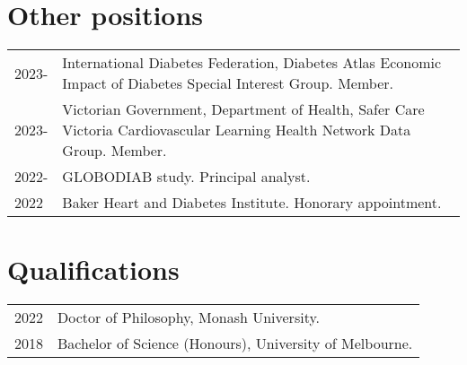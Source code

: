 \documentclass[11pt]{article}
\begin{document}
\section*{Other positions}
\begin{tabular}{p{2cm}p{14cm}}
2023- & International Diabetes Federation, Diabetes Atlas Economic Impact of Diabetes Special Interest Group. Member. \\
2023- & Victorian Government, Department of Health, 
Safer Care Victoria Cardiovascular Learning Health Network Data Group. Member. \\
2022- & GLOBODIAB study. Principal analyst.  \\
2022 & Baker Heart and Diabetes Institute. Honorary appointment.  \\
\end{tabular}

\section*{Qualifications}
\begin{tabular}{p{2cm}p{14cm}}
2022 & Doctor of Philosophy, Monash University. \\
2018 & Bachelor of Science (Honours), University of Melbourne. \\
\end{tabular}
\end{document}
